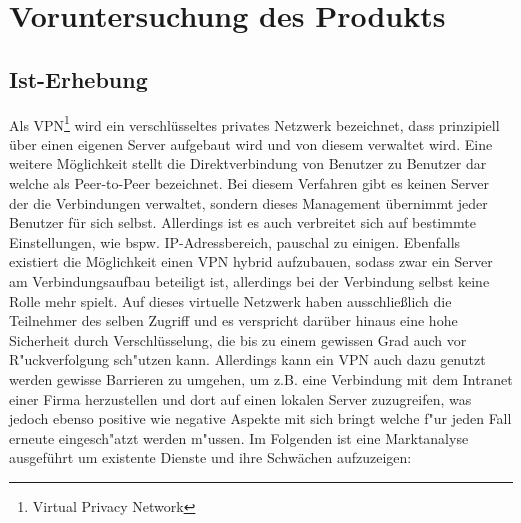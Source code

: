 \documentclass[a4paper,12pt]{scrreprt}
\begin{document}
\chapter{Voruntersuchung des Produkts}
	\section{Ist-Erhebung}
	
	Als VPN\footnote{Virtual Privacy Network} wird ein verschlüsseltes privates Netzwerk bezeichnet, dass prinzipiell über einen eigenen Server aufgebaut wird und von diesem verwaltet wird. Eine weitere Möglichkeit stellt die Direktverbindung von Benutzer zu Benutzer dar welche als Peer-to-Peer bezeichnet. Bei diesem Verfahren gibt es keinen Server der die Verbindungen verwaltet, sondern dieses Management übernimmt jeder Benutzer für sich selbst. Allerdings ist es auch verbreitet sich auf bestimmte Einstellungen, wie bspw. IP-Adressbereich, pauschal zu einigen. Ebenfalls existiert die Möglichkeit einen VPN hybrid aufzubauen, sodass zwar ein Server am Verbindungsaufbau beteiligt ist, allerdings bei der Verbindung selbst keine Rolle mehr spielt. Auf dieses virtuelle Netzwerk haben ausschließlich die Teilnehmer des selben Zugriff und es verspricht darüber hinaus eine hohe Sicherheit durch Verschlüsselung, die bis zu einem gewissen Grad auch vor R"uckverfolgung sch"utzen kann. Allerdings kann ein VPN auch dazu genutzt werden gewisse Barrieren zu umgehen, um z.B. eine Verbindung mit dem Intranet einer Firma herzustellen und dort auf einen lokalen Server zuzugreifen, was jedoch ebenso positive wie negative Aspekte mit sich bringt welche f"ur jeden Fall erneute eingesch"atzt werden m"ussen. Im Folgenden ist eine Marktanalyse ausgeführt um existente Dienste und ihre Schwächen aufzuzeigen:
	
\end{document}
